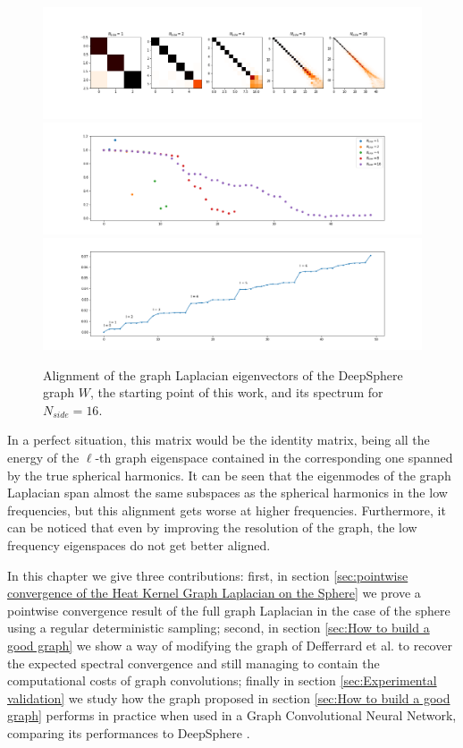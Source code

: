 \begin{figure}[h]
	\begin{center}
		\includegraphics[width=0.9\linewidth]{../codes/02.HeatKernelGraphLaplacian/HEALPix/06_figures/deepsphere_original.png}
		\includegraphics[width=0.9\linewidth]{../codes/02.HeatKernelGraphLaplacian/HEALPix/06_figures/deepsphere_original_diagonal.png}
		\includegraphics[width=0.9\linewidth]{../codes/02.HeatKernelGraphLaplacian/HEALPix/05_figs/old_results3.png}
	\end{center}
	\caption{\label{fig:Old spectrum1}Alignment of the graph Laplacian eigenvectors of the DeepSphere graph $W$, the starting point of this work, and its spectrum for $N_{side}=16$.}
\end{figure} 
In a perfect situation, this matrix would be the identity matrix, being all the energy of the $\ell$-th graph eigenspace contained in the corresponding one spanned by the true spherical harmonics. It can be seen that the eigenmodes of the graph Laplacian span almost the same subspaces as the spherical harmonics in the low frequencies, but this alignment gets worse at higher frequencies. Furthermore, it can be noticed that even by improving the resolution of the graph, the low frequency eigenspaces do not get better aligned.

In this chapter we give three contributions: first, in section \ref{sec:pointwise convergence of the Heat Kernel Graph Laplacian on the Sphere} we prove a pointwise convergence result of the full graph Laplacian in the case of the sphere using a regular deterministic sampling; second, in section \ref{sec:How to build a good graph} we show a way of modifying the graph of Defferrard et al. to recover the expected spectral convergence and still managing to contain the computational costs of graph convolutions; finally in section \ref{sec:Experimental validation} we study how the graph proposed in section \ref{sec:How to build a good graph} performs in practice when used in a Graph Convolutional Neural Network, comparing its performances to DeepSphere \cite{DeepSphere}.

